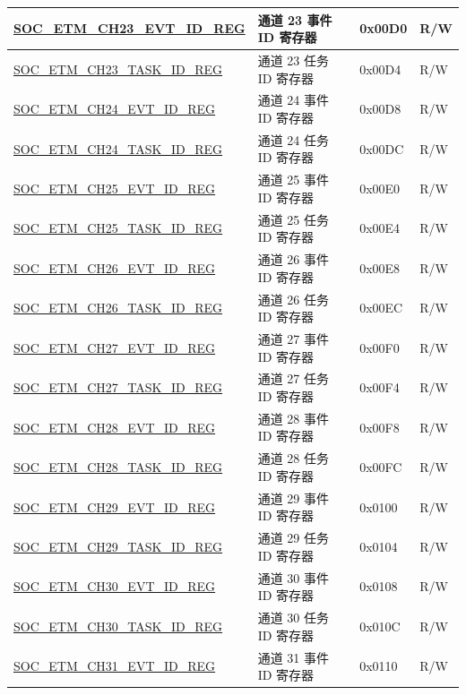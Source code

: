 \begin{longtable}{ | p{6cm} | p{6.4cm} | p{1.3cm} | p{1.8cm} | }
\hyperref[regdesc:SOCETMCH0EVTIDREG]{SOC\_ETM\_CH23\_EVT\_ID\_REG} & 通道 23 事件 ID 寄存器 & 0x00D0 & R/W \\ \hline
\hyperref[regdesc:SOCETMCH0TASKIDREG]{SOC\_ETM\_CH23\_TASK\_ID\_REG} & 通道 23 任务 ID 寄存器 & 0x00D4 & R/W \\ \hline
\hyperref[regdesc:SOCETMCH0EVTIDREG]{SOC\_ETM\_CH24\_EVT\_ID\_REG} & 通道 24 事件 ID 寄存器 & 0x00D8 & R/W \\ \hline
\hyperref[regdesc:SOCETMCH0TASKIDREG]{SOC\_ETM\_CH24\_TASK\_ID\_REG} & 通道 24 任务 ID 寄存器 & 0x00DC & R/W \\ \hline
\hyperref[regdesc:SOCETMCH0EVTIDREG]{SOC\_ETM\_CH25\_EVT\_ID\_REG} & 通道 25 事件 ID 寄存器 & 0x00E0 & R/W \\ \hline
\hyperref[regdesc:SOCETMCH0TASKIDREG]{SOC\_ETM\_CH25\_TASK\_ID\_REG} & 通道 25 任务 ID 寄存器 & 0x00E4 & R/W \\ \hline
\hyperref[regdesc:SOCETMCH0EVTIDREG]{SOC\_ETM\_CH26\_EVT\_ID\_REG} & 通道 26 事件 ID 寄存器 & 0x00E8 & R/W \\ \hline
\hyperref[regdesc:SOCETMCH0TASKIDREG]{SOC\_ETM\_CH26\_TASK\_ID\_REG} & 通道 26 任务 ID 寄存器 & 0x00EC & R/W \\ \hline
\hyperref[regdesc:SOCETMCH0EVTIDREG]{SOC\_ETM\_CH27\_EVT\_ID\_REG} & 通道 27 事件 ID 寄存器 & 0x00F0 & R/W \\ \hline
\hyperref[regdesc:SOCETMCH0TASKIDREG]{SOC\_ETM\_CH27\_TASK\_ID\_REG} & 通道 27 任务 ID 寄存器 & 0x00F4 & R/W \\ \hline
\hyperref[regdesc:SOCETMCH0EVTIDREG]{SOC\_ETM\_CH28\_EVT\_ID\_REG} & 通道 28 事件 ID 寄存器 & 0x00F8 & R/W \\ \hline
\hyperref[regdesc:SOCETMCH0TASKIDREG]{SOC\_ETM\_CH28\_TASK\_ID\_REG} & 通道 28 任务 ID 寄存器 & 0x00FC & R/W \\ \hline
\hyperref[regdesc:SOCETMCH0EVTIDREG]{SOC\_ETM\_CH29\_EVT\_ID\_REG} & 通道 29 事件 ID 寄存器 & 0x0100 & R/W \\ \hline
\hyperref[regdesc:SOCETMCH0TASKIDREG]{SOC\_ETM\_CH29\_TASK\_ID\_REG} & 通道 29 任务 ID 寄存器 & 0x0104 & R/W \\ \hline
\hyperref[regdesc:SOCETMCH0EVTIDREG]{SOC\_ETM\_CH30\_EVT\_ID\_REG} & 通道 30 事件 ID 寄存器 & 0x0108 & R/W \\ \hline
\hyperref[regdesc:SOCETMCH0TASKIDREG]{SOC\_ETM\_CH30\_TASK\_ID\_REG} & 通道 30 任务 ID 寄存器 & 0x010C & R/W \\ \hline
\hyperref[regdesc:SOCETMCH0EVTIDREG]{SOC\_ETM\_CH31\_EVT\_ID\_REG} & 通道 31 事件 ID 寄存器 & 0x0110 & R/W \\ \hline

\end{longtable}

